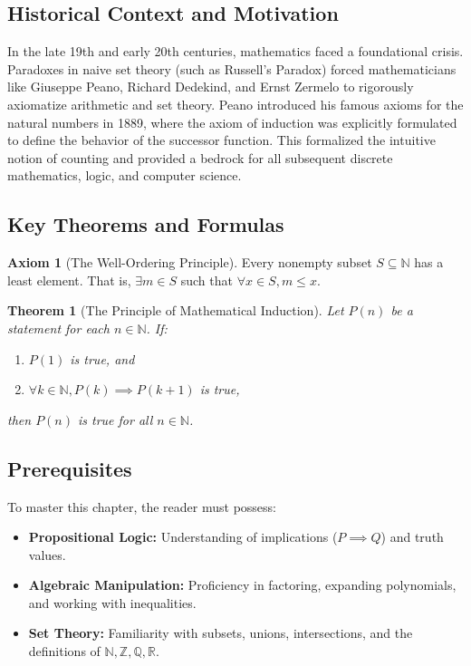 \documentclass[11pt, a4paper]{article}
\newtheorem{theorem}{Theorem}[section]
\theoremstyle{definition}
\newtheorem{axiom}{Axiom}[section]
\theoremstyle{remark}
\newcommand{\R}{\mathbb{R}}
\newcommand{\N}{\mathbb{N}}
\newcommand{\Z}{\mathbb{Z}}
\newcommand{\Q}{\mathbb{Q}}
\begin{document}
\subsection{Historical Context and Motivation}
In the late 19th and early 20th centuries, mathematics faced a foundational crisis. Paradoxes in naive set theory (such as Russell's Paradox) forced mathematicians like Giuseppe Peano, Richard Dedekind, and Ernst Zermelo to rigorously axiomatize arithmetic and set theory. Peano introduced his famous axioms for the natural numbers in 1889, where the axiom of induction was explicitly formulated to define the behavior of the successor function. This formalized the intuitive notion of counting and provided a bedrock for all subsequent discrete mathematics, logic, and computer science.

\subsection{Key Theorems and Formulas}
\begin{axiom}[The Well-Ordering Principle]
Every nonempty subset $S \subseteq \N$ has a least element. That is, $\exists m \in S$ such that $\forall x \in S, m \le x$.
\end{axiom}

\begin{theorem}[The Principle of Mathematical Induction]
Let $P(n)$ be a statement for each $n \in \N$. If:
\begin{enumerate}
    \item $P(1)$ is true, and
    \item $\forall k \in \N, P(k) \implies P(k+1)$ is true,
\end{enumerate}
then $P(n)$ is true for all $n \in \N$.
\end{theorem}

\subsection{Prerequisites}
To master this chapter, the reader must possess:
\begin{itemize}
    \item \textbf{Propositional Logic:} Understanding of implications ($P \implies Q$) and truth values.
    \item \textbf{Algebraic Manipulation:} Proficiency in factoring, expanding polynomials, and working with inequalities.
    \item \textbf{Set Theory:} Familiarity with subsets, unions, intersections, and the definitions of $\N, \Z, \Q, \R$.
\end{itemize}
\end{document}
